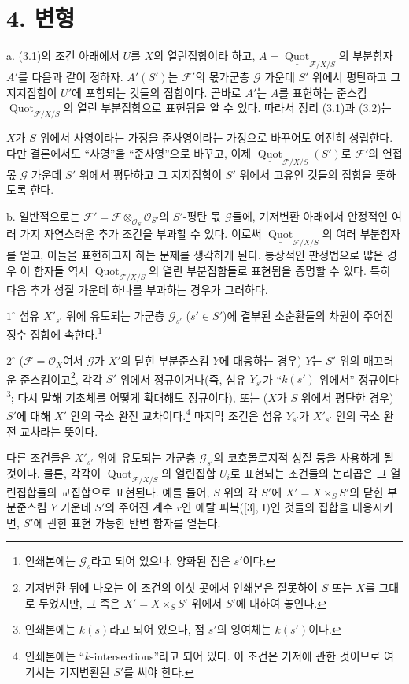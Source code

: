 \documentclass[11pt,twoside,openany]{book}
\numberwithin{equation}{section}
\newcommand{\sourceunit}{front}
\newcommand{\src}[1]{%
  \phantomsection\hypertarget{src:\sourceunit:#1}{}%
  \marginpar{\raggedleft\footnotesize\sffamily #1}%
}
\theoremstyle{plain}
\theoremstyle{definition}
\theoremstyle{remark}
\newcommand{\fsection}[2]{%
  \section*{#1. #2}%
  \addcontentsline{toc}{section}{#1. #2}%
}
\begin{document}
\fsection{4}{변형}

\noindent a. (3.1)의 조건 아래에서 $U$를 $X$의 열린집합이라 하고,
$A=\underline{\operatorname{Quot}}_{\mathcal F/X/S}$의 부분함자 $A'$를
다음과 같이 정하자. $A'(S')$는 $\mathcal F'$의 몫가군층 $\mathcal G$
가운데 $S'$ 위에서 평탄하고 그 지지집합이 $U'$에 포함되는 것들의
집합이다. 곧바로 $A'$는 $A$를 표현하는 준스킴
$\operatorname{Quot}_{\mathcal F/X/S}$의 열린 부분집합으로 표현됨을
알 수 있다. 따라서 정리 (3.1)과 (3.2)는
\src{267}
$X$가 $S$ 위에서 사영이라는 가정을 준사영이라는 가정으로 바꾸어도
여전히 성립한다. 다만 결론에서도 ``사영''을 ``준사영''으로 바꾸고,
이제 $\underline{\operatorname{Quot}}_{\mathcal F/X/S}(S')$로
$\mathcal F'$의 연접 몫 $\mathcal G$ 가운데 $S'$ 위에서 평탄하고
그 지지집합이 $S'$ 위에서 고유인 것들의 집합을 뜻하도록 한다.

\medskip
\noindent b. 일반적으로는
$\mathcal F'=\mathcal F\otimes_{\mathcal O_S}\mathcal O_{S'}$의
$S'$-평탄 몫 $\mathcal G$들에, 기저변환 아래에서 안정적인 여러 가지
자연스러운 추가 조건을 부과할 수 있다. 이로써
$\underline{\operatorname{Quot}}_{\mathcal F/X/S}$의 여러 부분함자를
얻고, 이들을 표현하고자 하는 문제를 생각하게 된다. 통상적인 판정법으로
많은 경우 이 함자들 역시 $\operatorname{Quot}_{\mathcal F/X/S}$의
열린 부분집합들로 표현됨을 증명할 수 있다. 특히 다음 추가 성질 가운데
하나를 부과하는 경우가 그러하다.

\smallskip
\noindent $1^\circ$ 섬유 $X'_{s'}$ 위에 유도되는 가군층
$\mathcal G_{s'}$ ($s'\in S'$)에 결부된 소순환들의 차원이 주어진
정수 집합에 속한다.\footnote{인쇄본에는
$\mathcal G_s$라고 되어 있으나, 양화된 점은 $s'$이다.}

\smallskip
\noindent $2^\circ$ ($\mathcal F=\mathcal O_X$여서 $\mathcal G$가
$X'$의 닫힌 부분준스킴 $Y$에 대응하는 경우) $Y$는 $S'$ 위의 매끄러운
준스킴이고\footnote{기저변환 뒤에 나오는 이 조건의
여섯 곳에서 인쇄본은 잘못하여 $S$ 또는 $X$를 그대로 두었지만, 그 족은
$X'=X\times_SS'$ 위에서 $S'$에 대하여 놓인다.}, 각각 $S'$ 위에서
정규이거나(즉, 섬유 $Y_{s'}$가 ``$k(s')$ 위에서''
정규이다\footnote{인쇄본에는 $k(s)$라고 되어 있으나,
점 $s'$의 잉여체는 $k(s')$이다.}; 다시 말해 기초체를 어떻게 확대해도
정규이다), 또는 ($X$가 $S$ 위에서 평탄한 경우) $S'$에 대해 $X'$ 안의
국소 완전 교차이다.\footnote{인쇄본에는
``$k$-intersections''라고 되어 있다. 이 조건은 기저에 관한 것이므로 여기서는 기저변환된 $S'$를 써야 한다.}
마지막 조건은 섬유 $Y_{s'}$가 $X'_{s'}$ 안의 국소 완전 교차라는 뜻이다.

다른 조건들은 $X'_{s'}$ 위에 유도되는 가군층 $\mathcal G_{s'}$의
코호몰로지적 성질 등을 사용하게 될 것이다. 물론, 각각이
$\operatorname{Quot}_{\mathcal F/X/S}$의 열린집합 $U_i$로 표현되는
조건들의 논리곱은 그 열린집합들의 교집합으로 표현된다. 예를 들어,
$S$ 위의 각 $S'$에 $X'=X\times_SS'$의 닫힌 부분준스킴 $Y$ 가운데
$S'$의 주어진 계수 $r$인 에탈 피복([3], I)인 것들의 집합을 대응시키면,
$S'$에 관한 표현 가능한 반변 함자를 얻는다.
\end{document}

